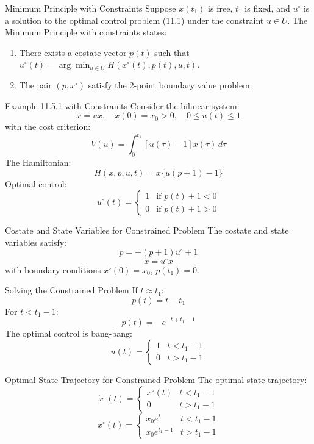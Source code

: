 \documentclass[10pt]{beamer}
\begin{document}
\begin{frame}[fragile]{Minimum Principle with Constraints}
  Suppose \( x(t_1) \) is free, \( t_1 \) is fixed, and \( u^\circ \) is a solution to the optimal control problem (11.1) under the constraint \( u \in U \). The Minimum Principle with constraints states:
  \begin{enumerate}
      \item There exists a costate vector \( p(t) \) such that \( u^\circ(t) = \arg \min_{u \in U} H(x^\circ(t), p(t), u, t) \).
      \item The pair \( (p, x^\circ) \) satisfy the 2-point boundary value problem.
  \end{enumerate}
\end{frame}
  
\begin{frame}[fragile]{Example 11.5.1 with Constraints}
  Consider the bilinear system:
  \[
  \dot{x} = ux, \quad x(0) = x_0 > 0, \quad 0 \le u(t) \le 1
  \]
  with the cost criterion:
  \[
  V(u) = \int_0^{t_1} [u(\tau) - 1] x(\tau) \, d\tau
  \]
  The Hamiltonian:
  \[
  H(x, p, u, t) = x \{ u(p + 1) - 1 \}
  \]
  Optimal control:
  \[
  u^\circ(t) = \begin{cases}
  1 & \text{if } p(t) + 1 < 0 \\
  0 & \text{if } p(t) + 1 > 0
  \end{cases}
  \]
\end{frame}
  
\begin{frame}[fragile]{Costate and State Variables for Constrained Problem}
  The costate and state variables satisfy:
  \[
  \dot{p} = -(p + 1) u^\circ + 1
  \]
  \[
  \dot{x} = u^\circ x
  \]
  with boundary conditions \( x^\circ(0) = x_0 \), \( p(t_1) = 0 \).
\end{frame}
  
\begin{frame}[fragile]{Solving the Constrained Problem}
  If \( t \approx t_1 \):
  \[
  p(t) = t - t_1
  \]
  For \( t < t_1 - 1 \):
  \[
  p(t) = -e^{-t + t_1 - 1}
  \]
  The optimal control is bang-bang:
  \[
  u(t) = \begin{cases}
  1 & t < t_1 - 1 \\
  0 & t > t_1 - 1
  \end{cases}
  \]
\end{frame}
  
\begin{frame}[fragile]{Optimal State Trajectory for Constrained Problem}
  The optimal state trajectory:
  \[
  \dot{x}^\circ(t) = \begin{cases}
  x^\circ(t) & t < t_1 - 1 \\
  0 & t > t_1 - 1
  \end{cases}
  \]
  \[
  x^\circ(t) = \begin{cases}
  x_0 e^t & t < t_1 - 1 \\
  x_0 e^{t_1 - 1} & t > t_1 - 1
  \end{cases}
  \]
\end{frame}
  
\end{document}
